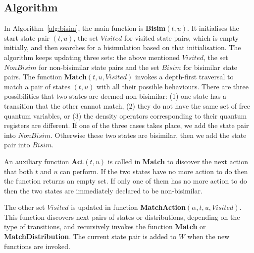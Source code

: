 \documentclass[a4paper,runningheads]{llncs}
\begin{document}
\subsection{Algorithm}\label{sec:strong_bisim_alg}
In Algorithm~\ref{alg:bisim}, the main function is \textbf{Bisim}$(t,u)$. It initialises the start state pair $(t,u)$, the set $Visited$ for visited state pairs, which is empty initially, and then searches for a bisimulation based on that initialisation. 
The algorithm keeps updating three sets: the above mentioned $Visited$, the set $NonBisim$ for non-bisimilar state pairs and the set $Bisim$ for bisimilar state pairs. The function \textbf{Match}$(t,u,Visited)$ invokes a depth-first traversal to match a pair of 
states $(t,u)$ with all their possible behaviours. There are three possibilities that two states are deemed non-bisimilar:  (1) one state has a transition that the other cannot match, (2) they do not have the same set of free quantum variables, or (3) the density operators corresponding to their quantum registers are different. If one of the three cases takes place, we add the state pair into $NonBisim$. Otherwise these two states are bisimilar, then we add the state pair into $Bisim$.

An auxiliary function \textbf{Act}$(t,u)$ is called in \textbf{Match} to discover the next action that both $t$ and $u$ can perform. If the two states have no more action to do then the function returns an empty set. If only one of them has no more action to do then the two states are immediately declared to be non-bisimilar. 

The other set $Visited$ is updated in function \textbf{MatchAction}$(\alpha,t,u,Visited)$. This function discovers next pairs of states or distributions, depending on the type of transitions,  and recursively invokes the function \textbf{Match} or \textbf{MatchDistribution}. The current state pair is added to $W$ when the new functions are invoked.
\end{document}
